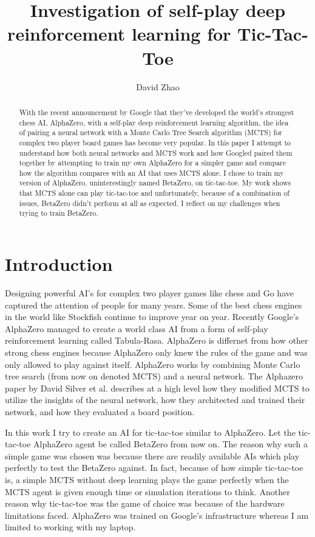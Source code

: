 \documentclass[letterpaper]{article} %
\begin{document}
%
\title{Investigation of self-play deep reinforcement learning for Tic-Tac-Toe}
\author{David Zhao}
\maketitle
\begin{abstract}
  With the recent announcement by Google that they've developed the world's
  strongest chess AI, AlphaZero, with a self-play deep reinforcement learning
  algorithm, the idea of pairing a neural network with a Monte Carlo Tree Search
  algorithm (MCTS) for complex two player board games has become very popular.
  In this paper I attempt to understand how both neural networks and MCTS work
  and how Googled paired them together by attempting to train my own AlphaZero
  for a simpler game and compare how the algorithm compares with an AI that uses
  MCTS alone. I chose to train my version of AlphaZero, uninterestingly named
  BetaZero, on tic-tac-toe. My work shows that MCTS alone can play tic-tac-toe
  and unfortunately, because of a combination of issues, BetaZero didn't perform
  at all as expected. I reflect on my challenges when trying to train BetaZero.
\end{abstract}

\section{Introduction}
  Designing powerful AI's for complex two player games like chess and Go have
  captured the attention of people for many years. Some of the best chess
  engines in the world like Stockfish continue to improve year on year. Recently 
  Google's AlphaZero managed to create a world class AI from a form of self-play
  reinforcement learning called Tabula-Rasa. AlphaZero is differnet
  from how other strong chess engines because AlphaZero only knew the rules of
  the game and was only allowed to play against itself. AlphaZero works by
  combining Monte Carlo tree search (from now on denoted MCTS) and a neural
  network. The Alphazero paper by David Silver et al. describes at a high level
  how they modified MCTS to utilize the insights of the neural network, how they
  architected and trained their network, and how they evaluated a board
  position.\cite{2017arXiv171201815S}
  
  In this work I try to create an AI for tic-tac-toe similar to AlphaZero. Let
  the tic-tac-toe AlphaZero agent be called BetaZero from now on. The
  reason why such a simple game was chosen was because there are readily
  available AIs which play perfectly to test the BetaZero against.
  In fact, because of how simple tic-tac-toe is, a simple MCTS without deep
  learning plays the game perfectly when the MCTS agent is given enough time or
  simulation iterations to think. Another reason why tic-tac-toe was the game of
  choice was because of the hardware limitations faced. AlphaZero was trained on
  Google's infrastructure whereas I am limited to working with my laptop.
  
\end{document}
